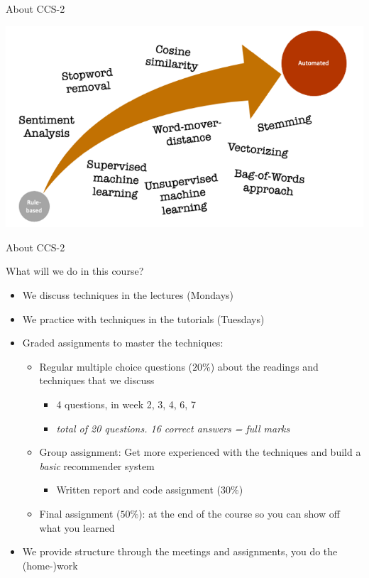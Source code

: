 \documentclass[handout]{beamer}
\begin{document}
\begin{frame}{About CCS-2}
	\begin{center}
		\includegraphics[width=\linewidth,height=\textheight,keepaspectratio]{../pictures/Roadmap_terms.png} 
	\end{center}
\end{frame}


\begin{frame}{About CCS-2} 

What will we do in this course?	
	\begin{itemize}[<+->]
		\item We discuss techniques in the lectures (Mondays)
		\item We practice with techniques in the tutorials (Tuesdays)
		\item Graded assignments to master the techniques:
		\begin{itemize}
			\item Regular multiple choice questions (\(20\%\)) about the readings and techniques that we discuss
			\begin{itemize}
				\item 4 questions, in week 2, 3, 4, 6, 7 
				\item \emph{total of 20 questions. 16 correct answers = full marks}
			\end{itemize}
			\item Group assignment: Get more experienced with the techniques and build a \emph{basic} recommender system
			\begin{itemize}
				\item Written report and code assignment (\(30\%\))
			\end{itemize}
			\item Final assignment (\(50\%\)): at the end of the course so you can show off what you learned
		\end{itemize}
		\item We provide structure through the meetings and assignments, you do the (home-)work
	\end{itemize}
	
\end{frame}
\end{document}
